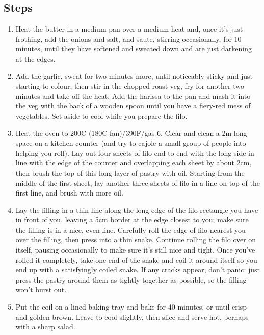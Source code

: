 \documentclass{book}
\begin{document}
\subsection*{Steps}
\begin{enumerate}
\item Heat the butter in a medium pan over a medium heat and, once it’s just frothing, add the onions and salt, and saute, stirring occasionally, for 10 minutes, until they have softened and sweated down and are just darkening at the edges.
\item Add the garlic, sweat for two minutes more, until noticeably sticky and just starting to colour, then stir in the chopped roast veg, fry for another two minutes and take off the heat. Add the harissa to the pan and mash it into the veg with the back of a wooden spoon until you have a fiery-red mess of vegetables. Set aside to cool while you prepare the filo.
\item Heat the oven to 200C (180C fan)/390F/gas 6. Clear and clean a 2m-long space on a kitchen counter (and try to cajole a small group of people into helping you roll). Lay out four sheets of filo end to end with the long side in line with the edge of the counter and overlapping each sheet by about 2cm, then brush the top of this long layer of pastry with oil. Starting from the middle of the first sheet, lay another three sheets of filo in a line on top of the first line, and brush with more oil.
\item Lay the filling in a thin line along the long edge of the filo rectangle you have in front of you, leaving a 5cm border at the edge closest to you; make sure the filling is in a nice, even line. Carefully roll the edge of filo nearest you over the filling, then press into a thin snake. Continue rolling the filo over on itself, pausing occasionally to make sure it’s still nice and tight. Once you’ve rolled it completely, take one end of the snake and coil it around itself so you end up with a satisfyingly coiled snake. If any cracks appear, don’t panic: just press the pastry around them as tightly together as possible, so the filling won’t burst out.
\item Put the coil on a lined baking tray and bake for 40 minutes, or until crisp and golden brown. Leave to cool slightly, then slice and serve hot, perhaps with a sharp salad.
\end{enumerate}
\newpage
\end{document}
